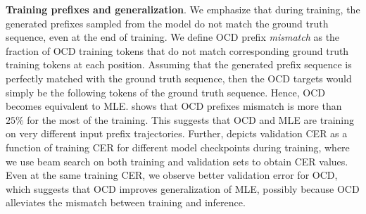 {\bf Training prefixes and generalization}. We emphasize that during training, the generated prefixes sampled from the model do not match the ground truth sequence, even at the end of training.
We define OCD prefix {\em mismatch} as the fraction of OCD training tokens that do not match corresponding ground truth training tokens at each position.
Assuming that the generated prefix sequence is perfectly matched with the ground truth sequence, then the OCD targets would simply be the following tokens of the ground truth sequence.
Hence, OCD becomes equivalent to MLE. %
 shows that OCD prefixes mismatch is more than $25\%$ for the most of the training.
This suggests that OCD and MLE are training on very different input prefix trajectories.
Further,  depicts validation CER as a function of training CER for different model checkpoints during training,
where we use beam search on both training and validation sets to obtain CER values.
Even at the same training CER, we observe better validation error for OCD, which suggests that OCD improves generalization of MLE, possibly
because OCD alleviates the mismatch between training and inference.

